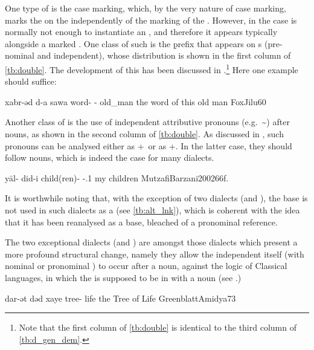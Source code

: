 One type of   is the \gen* case marking, which, by the very nature of case marking, marks the  on the \secn independently of the marking of the \prim. However, in  the \gen* case is normally not enough to instantiate an , and therefore it appears typically alongside a \cst* marked \prim. One class of such \gen* {} is the \d prefix that appears on \dem*s (pre-nominal and independent), whose distribution is shown in the first column of \ref{tb:double}. The development of this  has been discussed in .\footnote{Note that the first column of \ref{tb:double} is identical to the third column of \vref{tb:d_gen_dem}.} Here one example should suffice:

{xabr-əd d-a sawa}
{word-\cst{} \gen-\dem{} old\_man}
{the word of this old man}
{FoxJilu}{60}

Another class of \gen* {} is the use of independent attributive pronouns (e.g.\ \~) after \cst* nouns, as shown in the second column of \ref{tb:double}. As discussed in , such pronouns can be analysed either as \lnk+\poss\ or as \gen+\poss. In the latter case, they should follow \cst* nouns, which is indeed the case for many dialects. 

{yāl- did-i}
{child(ren)-\cst{} \gen-\poss.1\sg}
{my children}
{MutzafiBarzani2002}{66f.}

It is worthwhile noting that, with the exception of two dialects (\Amd and \Betn), the base  is not used in such dialects as a \lnk* (see \vref{tb:alt_lnk}), which is coherent with the idea that it has been reanalysed as a \gen* base, bleached of a pronominal reference. 



The two exceptional dialects (\Amd and \Betn) are amongst those dialects which present a more profound structural change, namely they  allow the independent \lnk* itself (with nominal or pronominal \secns) to occur after a \cst* noun, against the logic of Classical  languages, in which the \lnk* is supposed to be in  with a  noun (see .) 

{dar-ət dəd xaye}
{tree-\cst{} \lnk{} life}
{the Tree of Life}
{GreenblattAmidya}{73}

